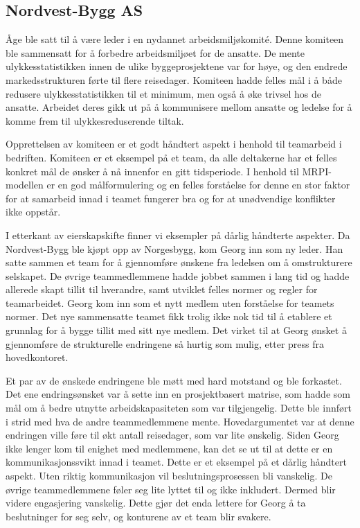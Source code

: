 \documentclass[norsk]{article}
\begin{document}
\subsection{Nordvest-Bygg AS}

Åge ble satt til å være leder i en nydannet arbeidsmiljøkomité. Denne komiteen ble sammensatt for å forbedre arbeidsmiljøet for de ansatte. De mente ulykkesstatistikken innen de ulike byggeprosjektene var for høye, og den endrede markedsstrukturen førte til flere reisedager. Komiteen hadde felles mål i å både redusere ulykkesstatistikken til et minimum, men også å øke trivsel hos de ansatte. Arbeidet deres gikk ut på å kommunisere mellom ansatte og ledelse for å komme frem til ulykkesreduserende tiltak.

Opprettelsen av komiteen er et godt håndtert aspekt i henhold til teamarbeid i bedriften. Komiteen er et eksempel på et team, da alle deltakerne har et felles konkret mål de ønsker å nå innenfor en gitt tidsperiode. I henhold til MRPI-modellen er en god målformulering og en felles forståelse for denne en stor faktor for at samarbeid innad i teamet fungerer bra og for at unødvendige konflikter ikke oppstår.

I etterkant av eierskapskifte finner vi eksempler på dårlig håndterte aspekter. Da Nordvest-Bygg ble kjøpt opp av Norgesbygg, kom Georg inn som ny leder. Han satte sammen et team for å gjennomføre ønskene fra ledelsen om å omstrukturere selskapet. De øvrige teammedlemmene hadde jobbet sammen i lang tid og hadde allerede skapt tillit til hverandre, samt utviklet felles normer og regler for teamarbeidet. Georg kom inn som et nytt medlem uten forståelse for teamets normer. Det nye sammensatte teamet fikk trolig ikke nok tid til å etablere et grunnlag for å bygge tillit med sitt nye medlem. Det virket til at Georg ønsket å gjennomføre de strukturelle endringene så hurtig som mulig, etter press fra hovedkontoret.

Et par av de ønskede endringene ble møtt med hard motstand og ble forkastet. Det ene endringsønsket var å sette inn en prosjektbasert matrise, som hadde som mål om å bedre utnytte arbeidskapasiteten som var tilgjengelig. Dette ble innført i strid med hva de andre teammedlemmene mente. Hovedargumentet var at denne endringen ville føre til økt antall reisedager, som var lite ønskelig. Siden Georg ikke lenger kom til enighet med medlemmene, kan det se ut til at dette er en kommunikasjonssvikt innad i teamet. Dette er et eksempel på et dårlig håndtert aspekt. Uten riktig kommunikasjon vil beslutningsprosessen bli vanskelig. De øvrige teammedlemmene føler seg lite lyttet til og ikke inkludert. Dermed blir videre engasjering vanskelig. Dette gjør det enda lettere for Georg å ta beslutninger for seg selv, og konturene av et team blir svakere.
\end{document}
